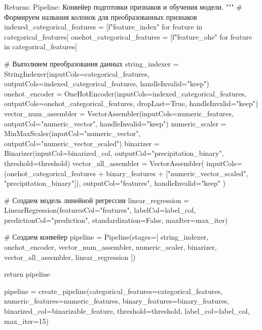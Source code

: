 \begin{code}
    Returns:
        Pipeline: Конвейер подготовки признаков и обучения модели.
    """
    # Формируем названия колонок для преобразованных признаков
    indexed_categorical_features = [f"{feature}_index" for feature in categorical_features]
    onehot_categorical_features = [f"{feature}_ohe" for feature in categorical_features]

    # Выполняем преобразования данных
    string_indexer = StringIndexer(inputCols=categorical_features,
                                   outputCols=indexed_categorical_features,
                                   handleInvalid="keep")
    onehot_encoder = OneHotEncoder(inputCols=indexed_categorical_features,
                                   outputCols=onehot_categorical_features,
                                   dropLast=True,
                                   handleInvalid="keep")
    vector_num_assembler = VectorAssembler(inputCols=numeric_features,
                                           outputCol="numeric_vector",
                                           handleInvalid="keep")
    numeric_scaler = MinMaxScaler(inputCol="numeric_vector",
                                  outputCol="numeric_vector_scaled")
    binarizer = Binarizer(inputCol=binarized_col,
                          outputCol="precipitation_binary",
                          threshold=threshold)
    vector_all_assembler = VectorAssembler(
        inputCols=(onehot_categorical_features + binary_features +
                   ["numeric_vector_scaled", "precipitation_binary"]),
        outputCol="features",
        handleInvalid="keep"
    )

    # Создаем модель линейной регрессии
    linear_regression = LinearRegression(featuresCol="features",
                                         labelCol=label_col,
                                         predictionCol="prediction",
                                         standardization=False,
                                         maxIter=max_iter)

    # Создаем конвейер
    pipeline = Pipeline(stages=[
        string_indexer, onehot_encoder, vector_num_assembler,
        numeric_scaler, binarizer, vector_all_assembler,
        linear_regression
    ])

    return pipeline

pipeline = create_pipeline(categorical_features=categorical_features,
                           numeric_features=numeric_features,
                           binary_features=binary_features,
                           binarized_col=binarizable_feature,
                           threshold=threshold,
                           label_col=label_col,
                           max_iter=15)


\end{code}
